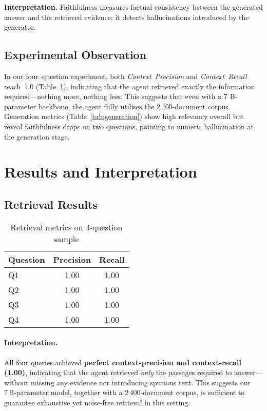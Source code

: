 \documentclass[conference]{IEEEtran}
\begin{document}
\textbf{Interpretation.}  Faithfulness measures factual consistency between the
generated answer and the retrieved evidence; it detects hallucinations
introduced by the generator.

\subsection{Experimental Observation}
In our four–question experiment, both \emph{Context~Precision} and
\emph{Context~Recall} reach~1.0 (Table~\ref{tab:retrieval}), indicating that the
agent retrieved exactly the information required—nothing more, nothing less.
This suggests that even with a 7 B-parameter backbone, the agent fully utilises
the 2\,400-document corpus.  Generation metrics
(Table~\ref{tab:generation}) show high relevancy overall but reveal faithfulness
drops on two questions, pointing to numeric hallucination at the generation
stage.

\section{Results and Interpretation}

\subsection{Retrieval Results}

\begin{table}[ht]
  \caption{Retrieval metrics on 4-question sample}
  \label{tab:retrieval}
  \centering
  \begin{tabular*}{\linewidth}{@{\extracolsep{\fill}}lcc}
    \toprule
    \textbf{Question} & \textbf{Precision} & \textbf{Recall}\\
    \midrule
    Q1 & 1.00 & 1.00\\
    Q2 & 1.00 & 1.00\\
    Q3 & 1.00 & 1.00\\
    Q4 & 1.00 & 1.00\\
    \bottomrule
  \end{tabular*}
\end{table}

\paragraph{Interpretation.}
All four queries achieved \textbf{perfect context‑precision and context‑recall (1.00)}, indicating that the agent retrieved \emph{only} the passages required to answer—without missing any evidence nor introducing spurious text.  
This suggests our 7 B‑parameter model, together with a 2 400‑document corpus, is sufficient to guarantee exhaustive yet noise‑free retrieval in this setting.
\end{document}
